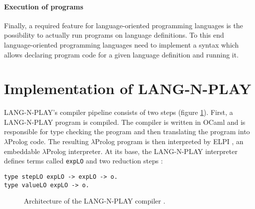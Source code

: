 \paragraph{Execution of programs}
Finally, a required feature for language-oriented programming languages is the possibility to actually run programs on language definitions. To this end language-oriented programming languages need to implement a syntax which allows declaring program code for a given language definition and running it.


\section{Implementation of LANG-N-PLAY}
\label{lang-n-play} LANG-N-PLAY's compiler pipeline consists of two steps (figure \ref{fig:lnp-architecture}). First, a LANG-N-PLAY program is compiled. The compiler is written in OCaml and is responsible for type checking the program and then translating the program into $\lambda$Prolog code. The resulting $\lambda$Prolog program is then interpreted by ELPI \cite{noauthor_elpi_2022}, an embeddable $\lambda$Prolog interpreter. At its base, the LANG-N-PLAY interpreter defines terms called \lstinline|expLO| and two reduction steps \cite{cimini_effectiveness_2020}:

\begin{lstlisting}
type stepLO expLO -> expLO -> o.
type valueLO expLO -> o.
\end{lstlisting}

\begin{figure}
  \centering
  \caption{Architecture of the LANG-N-PLAY compiler \cite{cimini_effectiveness_2020}.}
  \label{fig:lnp-architecture}
\end{figure}

